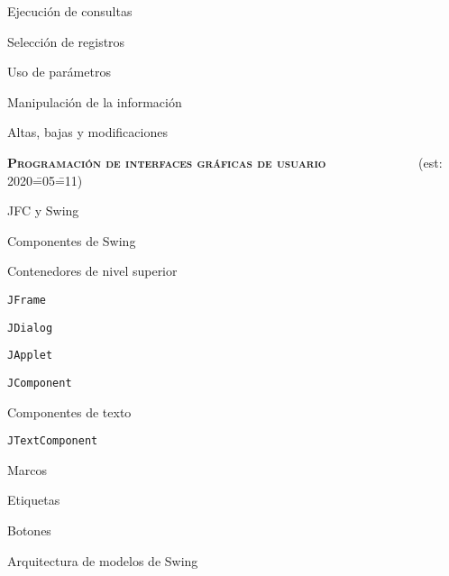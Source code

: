 \begin{longenum}
\begin{longenum}
\begin{longenum}
            \item Ejecución de consultas
            \item Selección de registros
            \item Uso de parámetros
        \end{longenum}
        \item Manipulación de la información
        \begin{longenum}
            \item Altas, bajas y modificaciones
        \end{longenum}
    \end{longenum}
    \item \textbf{\textsc{Programación de interfaces gráficas de usuario}} \ \ \ \ \ \ \ \ \ \opcional\ \ \ \ \ (est: 2020\==05\==11)
    \begin{longenum}
        \item JFC y Swing
        \item Componentes de Swing
        \item Contenedores de nivel superior
        \begin{longenum}
            \item \texttt{JFrame}
            \item \texttt{JDialog}
            \item \texttt{JApplet}
        \end{longenum}
        \item \texttt{JComponent}
        \item Componentes de texto
        \begin{longenum}
            \item \texttt{JTextComponent}
        \end{longenum}
        \item Marcos
        \item Etiquetas
        \item Botones
        \item Arquitectura de modelos de Swing
    \end{longenum}
\end{longenum}
